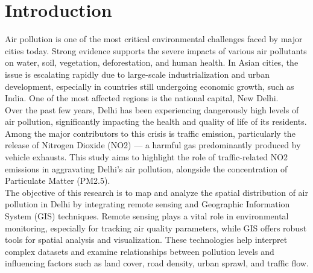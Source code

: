 \documentclass[12pt]{report}
\begin{document}
\chapter{Introduction}
Air pollution is one of the most critical environmental challenges faced by major cities today. Strong evidence supports the severe impacts of various air pollutants on water, soil, vegetation, deforestation, and human health. In Asian cities, the issue is escalating rapidly due to large-scale industrialization and urban development, especially in countries still undergoing economic growth, such as India. One of the most affected regions is the national capital, New Delhi.\\
Over the past few years, Delhi has been experiencing dangerously high levels of air pollution, significantly impacting the health and quality of life of its residents. Among the major contributors to this crisis is traffic emission, particularly the release of Nitrogen Dioxide (NO2) — a harmful gas predominantly produced by vehicle exhausts. This study aims to highlight the role of traffic-related NO2 emissions in aggravating Delhi’s air pollution, alongside the concentration of Particulate Matter (PM2.5).\\
The objective of this research is to map and analyze the spatial distribution of air pollution in Delhi by integrating remote sensing and Geographic Information System (GIS) techniques. Remote sensing plays a vital role in environmental monitoring, especially for tracking air quality parameters, while GIS offers robust tools for spatial analysis and visualization. These technologies help interpret complex datasets and examine relationships between pollution levels and influencing factors such as land cover, road density, urban sprawl, and traffic flow.\\
\end{document}
